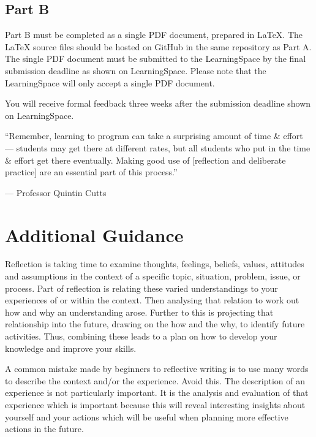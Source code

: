 \documentclass{../fal_assignment}
\begin{document}
\subsection*{Part B}

Part B must be completed as a single PDF document, prepared in LaTeX. The LaTeX source files should be hosted on GitHub in the same repository as Part A. The single PDF document must be submitted to the LearningSpace by the final submission deadline as shown on LearningSpace. Please note that the LearningSpace will only accept a single PDF document.

You will receive formal feedback three weeks after the submission deadline shown on LearningSpace.

\begin{marginquote}
    ``Remember, learning to program can take a surprising amount of time \& effort --- students may get there at different rates, but all students who put in the time \& effort get there eventually. Making good use of [reflection and deliberate practice] are an essential part of this process.''
    
    --- Professor Quintin Cutts
\end{marginquote}
\section*{Additional Guidance}

Reflection is taking time to examine thoughts, feelings, beliefs, values, attitudes and assumptions in the context of a specific topic, situation, problem, issue, or process. Part of reflection is relating these varied understandings to your experiences of or within the context. Then analysing that relation to work out how and why an understanding arose. Further to this is projecting that relationship into the future, drawing on the how and the why, to identify future activities. Thus, combining these leads to a plan on how to develop your knowledge and improve your skills.

A common mistake made by beginners to reflective writing is to use many words to describe the context and/or the experience. Avoid this. The description of an experience is not particularly important. It is the analysis and evaluation of that experience which is important because this will reveal interesting insights about yourself and your actions which will be useful when planning more effective actions in the future.
\end{document}
